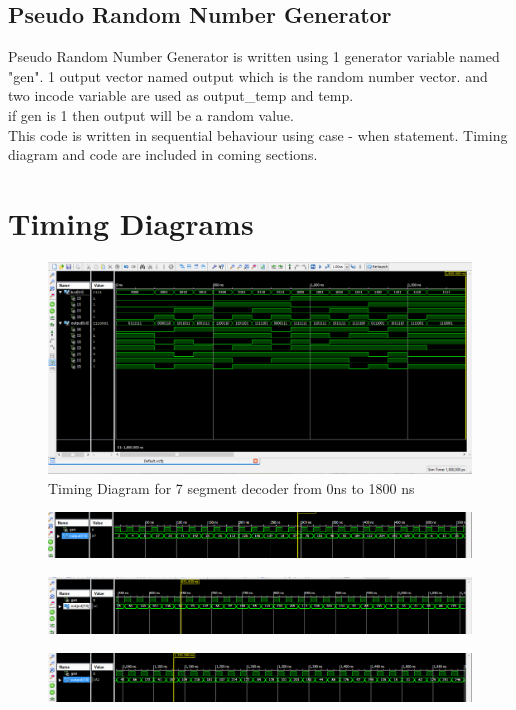 \documentclass[12pt]{article}
\begin{document}
\subsection {Pseudo Random Number Generator}
Pseudo Random Number Generator is written using 1 generator variable named "gen". 1 output vector named output which is the random number vector. and two incode variable are used as output\_temp and temp.\\
if gen is 1 then output will be a random value. 
\\
This code is written in sequential behaviour using case - when statement. Timing diagram and code are included in coming 
sections. 
\section{Timing Diagrams}
\begin{figure}[!ht]
\centering
\includegraphics[scale=0.5]{bcd-segment}
\caption{Timing Diagram for 7 segment decoder from 0ns to 1800 ns}
\label{fig1}
\end{figure}
\newpage
\begin{figure}[!ht]
\centering
\includegraphics[scale=0.5]{Capture}
\end{figure}
\begin{figure}[!ht]
\centering
\includegraphics[scale=0.5]{Capture1}
\end{figure}
\begin{figure}[!ht]
\centering
\includegraphics[scale=0.5]{Capture2}
\end{figure}
\end{document}
